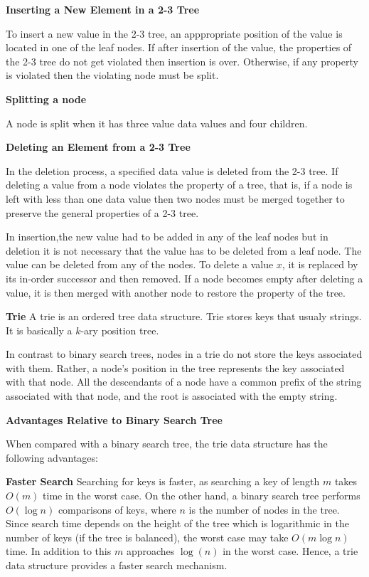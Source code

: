 \filbreak
\vskip 1cm
{\bf Inserting a New Element in a 2-3 Tree}

\vskip 1mm
To insert a new value in the 2-3 tree, an apppropriate position of the value is located in one of the leaf nodes. If after insertion of the value, the properties of the 2-3 tree do not get violated then insertion is over. Otherwise, if any property is violated then the violating node must be split.

\vskip 3mm
{\bf Splitting a node}

\vskip 1mm
A node is split when it has three value data values and four children.

\filbreak
\vskip 1cm
{\bf Deleting an Element from a 2-3 Tree}

\vskip 1mm
In the deletion process, a specified data value is deleted from the 2-3 tree. If deleting a value from a node violates the property of a tree, that is, if a node is left with less than one data value then two nodes must be merged together to preserve the general properties of a 2-3 tree.

\vskip 1mm
In insertion,the new value had to be added in any of the leaf nodes but in deletion it is not necessary that the value has to be deleted from a leaf node. The value can be deleted from any of the nodes. To delete a value $x$, it is replaced by its in-order successor and then removed. If a node becomes empty after deleting a value, it is then merged with another node to restore the property of the tree.

\filbreak
\vskip 1cm
{\bf Trie}
A trie is an ordered tree data structure. Trie stores keys that usualy strings. It is basically a $k$-ary position tree.

\vskip 1mm
In contrast to binary search trees, nodes in a trie do not store the keys associated with them. Rather, a node's position in the tree represents the key associated with that node. All the descendants of a node have a common prefix of the string associated with that node, and the root is associated with the empty string.

\vskip 3mm
{\bf Advantages Relative to Binary Search Tree}

\vskip 1mm
When compared with a binary search tree, the trie data structure has the following advantages:

\vskip 3mm
{\bf Faster Search}
\vskip 1mm
Searching for keys is faster, as searching a key of length $m$ takes $O(m)$ time in the worst case. On the other hand, a binary search tree performs $O(\log n)$ comparisons of keys, where $n$ is the number of nodes in the tree. Since search time depends on the height of the tree which is logarithmic in the number of keys (if the tree is balanced), the worst case may take $O(m \log n)$ time. In addition to this $m$ approaches $\log(n)$ in the worst case. Hence, a trie data structure provides a faster search mechanism.


